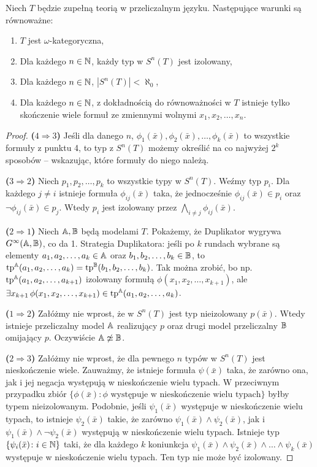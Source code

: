 \documentclass{article}
\begin{document}
\begin{tw}
	 Niech $T$ będzie zupełną teorią w przeliczalnym języku.
	 Następujące warunki są równoważne:
	 \begin{enumerate}
		 \item $T$ jest $\omega$-kategoryczna,
		 \item Dla każdego $n \in \mathbb{N}$, każdy typ w $S^n(T)$ jest izolowany,
		 \item Dla każdego $n \in \mathbb{N}$, $|S^n(T)| < \aleph_0$,
		 \item Dla każdego $n \in \mathbb{N}$, z dokładnością do równoważności w $T$ istnieje tylko skończenie wiele formuł ze zmiennymi wolnymi $x_1, x_2, \ldots, x_n$.
	 \end{enumerate}
\end{tw}
\begin{proof}
	\textbf{($4 \Rightarrow 3$)} Jeśli dla danego $n$, $\phi_1(\bar{x}), \phi_2(\bar{x}), \ldots, \phi_k(\bar{x})$  to wszystkie formuły z punktu 4, to typ z $S^n(T)$ możemy określić na co najwyżej $2^k$ sposobów -- wskazując, które formuły do niego należą.

	\textbf{($3 \Rightarrow 2$)} Niech $p_1, p_2, \ldots, p_k$ to wszystkie typy w $S^n(T)$.
	Weźmy typ $p_i$.
	Dla każdego $j \neq i$ istnieje formuła $\phi_{ij}(\bar{x})$ taka, że jednocześnie $\phi_{ij}(\bar{x}) \in p_i$ oraz $\neg \phi_{ij}(\bar{x}) \in p_j$.
	Wtedy $p_i$ jest izolowany przez $\bigwedge_{i \neq j} \phi_{ij}(\bar{x})$.

	\textbf{($2 \Rightarrow 1$)} Niech $\mathbb{A}, \mathbb{B}$ będą modelami $T$.
	Pokażemy, że Duplikator wygrywa $G^{\infty}(\mathbb{A}, \mathbb{B})$, co da 1.
	Strategia Duplikatora:
	jeśli po $k$ rundach wybrane są elementy $a_1, a_2, \ldots, a_k \in \mathbb{A}$ oraz $b_1, b_2, \ldots, b_k \in \mathbb{B}$, to $\text{tp}^{\mathbb{A}}(a_1, a_2, \ldots, a_k) = \text{tp}^{\mathbb{B}}(b_1, b_2, \ldots, b_k)$.
	Tak można zrobić, bo np. $\text{tp}^{\mathbb{A}}(a_1, a_2, \ldots, a_{k+1})$ izolowany formułą
	$\phi(x_1, x_2, \ldots, x_{k+1})$, ale $\exists x_{k+1} \, \phi(x_1, x_2, \ldots, x_{k+1}) \in \text{tp}^{\mathbb{A}}(a_1, a_2, \ldots, a_k)$.

	\textbf{($1 \Rightarrow 2$)} Załóżmy nie wprost, że w $S^n(T)$ jest typ nieizolowany $p(\bar{x})$.
	Wtedy istnieje przeliczalny model $\mathbb{A}$ realizujący $p$ oraz drugi model przeliczalny $\mathbb{B}$ omijający $p$.
	Oczywiście $\mathbb{A} \not \simeq \mathbb{B}$.

	\textbf{($2 \Rightarrow 3$)}
	Załóżmy nie wprost, że dla pewnego $n$ typów w $S^n(T)$ jest nieskończenie wiele.
	Zauważmy, że istnieje formuła $\psi(\bar{x})$ taka, że zarówno ona, jak i jej negacja występują w nieskończenie wielu typach.
	W przeciwnym przypadku zbiór $\{\phi(\bar{x}) \colon \phi \text{ występuje w nieskończenie wielu typach}\}$ byłby typem nieizolowanym.
	Podobnie, jeśli $\psi_1(\bar{x})$ występuje w nieskończenie wielu typach, to istnieje $\psi_2(\bar{x})$ takie, że zarówno $\psi_1(\bar{x})\wedge \psi_2(\bar{x})$, jak i $\psi_1(\bar{x})\wedge \neg \psi_2(\bar{x})$ występują w nieskończenie wielu typach.
	Istnieje typ $\{\psi_i(\bar{x}) \colon i \in \mathbb{N}\}$ taki, że dla każdego $k $ koniunkcja $\psi_1(\bar{x}) \wedge \psi_2(\bar{x}) \wedge \ldots \wedge \psi_k(\bar{x})$ występuje w nieskończenie wielu typach.
	Ten typ nie może być izolowany.


\end{proof}
\end{document}
